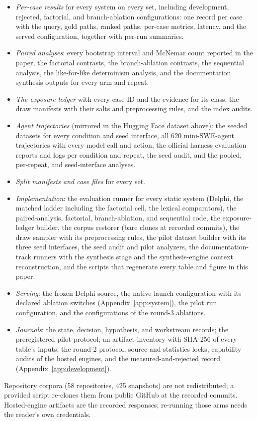 \documentclass{article}
\newcommand{\system}{Delphi}
\begin{document}
\begin{itemize}[leftmargin=1.2em]
\item \emph{Per-case results} for every system on every set, including development, rejected, factorial, and branch-ablation configurations: one record per case with the query, gold paths, ranked paths, per-case metrics, latency, and the served configuration, together with per-run summaries.
\item \emph{Paired analyses}: every bootstrap interval and McNemar count reported in the paper, the factorial contrasts, the branch-ablation contrasts, the sequential analysis, the like-for-like determinism analysis, and the documentation synthesis outputs for every arm and repeat.
\item \emph{The exposure ledger} with every case ID and the evidence for its class, the draw manifests with their salts and preprocessing rules, and the index audits.
\item \emph{Agent trajectories} (mirrored in the Hugging Face dataset above): the seeded datasets for every condition and seed interface, all 620 mini-SWE-agent trajectories with every model call and action, the official harness evaluation reports and logs per condition and repeat, the seed audit, and the pooled, per-repeat, and seed-interface analyses.
\item \emph{Split manifests and case files} for every set.
\item \emph{Implementation}: the evaluation runner for every static system (\system{}, the matched ladder including the factorial cell, the lexical comparators), the paired-analysis, factorial, branch-ablation, and sequential code, the exposure-ledger builder, the corpus restorer (bare clones at recorded commits), the draw sampler with its preprocessing rules, the pilot dataset builder with its three seed interfaces, the seed audit and pilot analyzers, the documentation-track runners with the synthesis stage and the synthesis-engine context reconstruction, and the scripts that regenerate every table and figure in this paper.
\item \emph{Serving}: the frozen \system{} source, the native launch configuration with its declared ablation switches (Appendix~\ref{app:system}), the pilot run configuration, and the configurations of the round-3 ablations.
\item \emph{Journals}: the state, decision, hypothesis, and workstream records; the preregistered pilot protocol; an artifact inventory with SHA-256 of every table's inputs; the round-2 protocol, source and statistics locks, capability audits of the hosted engines, and the measured-and-rejected record (Appendix~\ref{app:development}).
\end{itemize}

Repository corpora (58 repositories, 425 snapshots) are not redistributed; a provided script re-clones them from public GitHub at the recorded commits. Hosted-engine artifacts are the recorded responses; re-running those arms needs the reader's own credentials.
\end{document}
